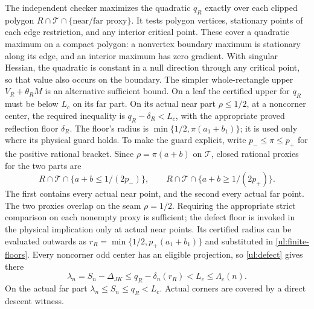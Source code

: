 The independent checker maximizes the quadratic $q_R$ exactly over
each clipped polygon $R\cap\mathcal T\cap\{\text{near/far proxy}\}$.
It tests polygon vertices, stationary points of each edge restriction,
and any interior critical point. These cover a quadratic maximum on a
compact polygon: a nonvertex boundary maximum is stationary along its
edge, and an interior maximum has zero gradient. With singular Hessian,
the quadratic is constant in a null direction through any critical point,
so that value also occurs on the boundary. The simpler whole-rectangle
upper $V_R+\theta_RM$ is an alternative sufficient bound.
On a leaf the certified upper for $q_R$ must be below $L_c$ on its far
part. On its actual near part $\rho\leq1/2$, at a noncorner center,
the required inequality is $q_R-\delta_R<L_c$, with the appropriate
proved reflection floor $\delta_R$. The floor's radius is
$\min\{1/2,\pi(a_1+b_1)\}$; it is used only where its physical guard
holds. To make the guard explicit, write $p_-\leq\pi\leq p_+$ for the
positive rational bracket. Since $\rho=\pi(a+b)$ on $\mathcal T$,
closed rational proxies for the two parts are
\[
 R\cap\mathcal T\cap\{a+b\leq1/(2p_-)\},\qquad
 R\cap\mathcal T\cap\{a+b\geq1/(2p_+)\}.
\]
The first contains every actual near point, and the second every actual
far point. The two proxies overlap on the seam $\rho=1/2$. Requiring the
appropriate strict comparison on each nonempty proxy is sufficient;
the defect floor is invoked in the physical implication only at actual
near points. Its certified radius can be evaluated outwards as
$r_R=\min\{1/2,p_+(a_1+b_1)\}$ and substituted in
\eqref{ul:finite-floors}. Every noncorner odd center has an eligible
projection, so \eqref{ul:defect} gives there
\[
 \lambda_n=S_n-\Delta_{JK}\leq q_R-\delta_n(r_R)<L_c
                                                   \leq\Lambda_c(n).
\]
On the actual far part $\lambda_n\leq S_n\leq q_R<L_c$.
Actual corners are covered by a direct descent witness.


